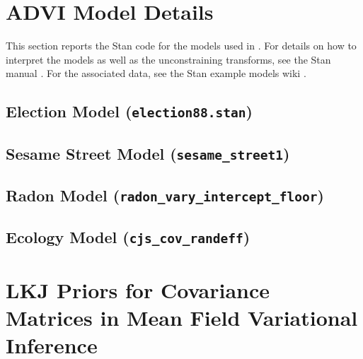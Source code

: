 \documentclass{article}\usepackage[]{graphicx}\usepackage[]{color}
\theoremstyle{definition}
\theoremstyle{plain}
\theoremstyle{plain}
\theoremstyle{plain}
\theoremstyle{definition}
\theoremstyle{plain}
\theoremstyle{plain}
\begin{document}
\section{ADVI Model Details}\label{app:advi}

This section reports the Stan code for the models used in .
For details on how to interpret the models as well as the unconstraining
transforms, see the Stan manual \citep{stan-manual:2015}.  For the associated data, see
the Stan example models wiki \citep{stan-examples:2017}.

\subsection{Election Model (\texttt{election88.stan})}


\subsection{Sesame Street Model (\texttt{sesame\_street1})}


\subsection{Radon Model (\texttt{radon\_vary\_intercept\_floor})}


\subsection{Ecology Model (\texttt{cjs\_cov\_randeff})}


\section{LKJ Priors for Covariance Matrices in Mean Field Variational Inference\label{app:lkj}}
\end{document}
